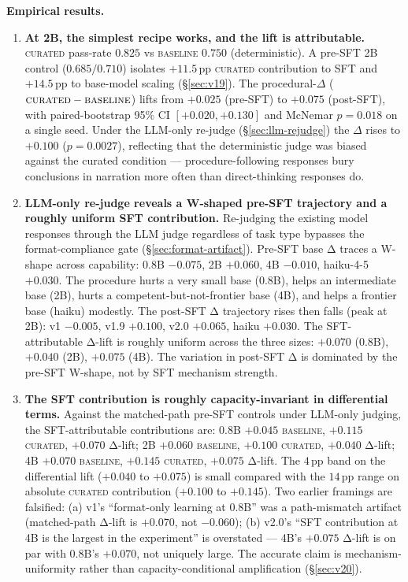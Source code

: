 \documentclass[10pt]{article}
\newcommand{\BL}{\textsc{baseline}\xspace}
\newcommand{\CU}{\textsc{curated}\xspace}
\begin{document}
\textbf{Empirical results.}
\begin{enumerate}[leftmargin=*, resume]
  \item \textbf{At 2B, the simplest recipe works, and the lift is attributable.} \CU{} pass-rate $0.825$ vs \BL{} $0.750$ (deterministic). A pre-SFT 2B control ($0.685/0.710$) isolates $+11.5$\,pp \CU{} contribution to SFT and $+14.5$\,pp to base-model scaling (\S\ref{sec:v19}). The procedural-$\Delta$ ($\CU - \BL$) lifts from $+0.025$ (pre-SFT) to $+0.075$ (post-SFT), with paired-bootstrap 95\% CI $[+0.020, +0.130]$ and McNemar $p{=}0.018$ on a single seed. Under the LLM-only re-judge (\S\ref{sec:llm-rejudge}) the $\Delta$ rises to $+0.100$ ($p{=}0.0027$), reflecting that the deterministic judge was biased against the curated condition --- procedure-following responses bury conclusions in narration more often than direct-thinking responses do.
  \item \textbf{LLM-only re-judge reveals a W-shaped pre-SFT trajectory and a roughly uniform SFT contribution.} Re-judging the existing model responses through the LLM judge regardless of task type bypasses the format-compliance gate (\S\ref{sec:format-artifact}). Pre-SFT base Δ traces a W-shape across capability: 0.8B $-0.075$, 2B $+0.060$, 4B $-0.010$, haiku-4-5 $+0.030$. The procedure hurts a very small base (0.8B), helps an intermediate base (2B), hurts a competent-but-not-frontier base (4B), and helps a frontier base (haiku) modestly. The post-SFT Δ trajectory rises then falls (peak at 2B): v1 $-0.005$, v1.9 $+0.100$, v2.0 $+0.065$, haiku $+0.030$. The SFT-attributable Δ-lift is roughly uniform across the three sizes: $+0.070$ (0.8B), $+0.040$ (2B), $+0.075$ (4B). The variation in post-SFT Δ is dominated by the pre-SFT W-shape, not by SFT mechanism strength.
  \item \textbf{The SFT contribution is roughly capacity-invariant in differential terms.} Against the matched-path pre-SFT controls under LLM-only judging, the SFT-attributable contributions are: 0.8B $+0.045$ \BL, $+0.115$ \CU, $+0.070$ Δ-lift; 2B $+0.060$ \BL, $+0.100$ \CU, $+0.040$ Δ-lift; 4B $+0.070$ \BL, $+0.145$ \CU, $+0.075$ Δ-lift. The $4$\,pp band on the differential lift ($+0.040$ to $+0.075$) is small compared with the $14$\,pp range on absolute \CU{} contribution ($+0.100$ to $+0.145$). Two earlier framings are falsified: (a) v1's ``format-only learning at 0.8B'' was a path-mismatch artifact (matched-path Δ-lift is $+0.070$, not $-0.060$); (b) v2.0's ``SFT contribution at 4B is the largest in the experiment'' is overstated --- 4B's $+0.075$ Δ-lift is on par with 0.8B's $+0.070$, not uniquely large. The accurate claim is mechanism-uniformity rather than capacity-conditional amplification (\S\ref{sec:v20}).

\end{enumerate}
\end{document}
